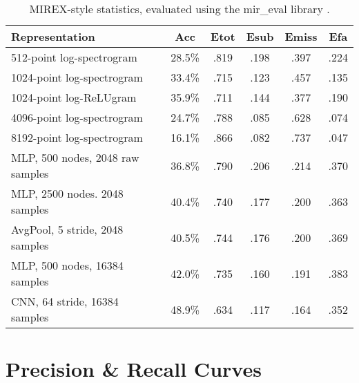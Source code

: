 \documentclass{article} \usepackage{iclr2017_conference,times}
\begin{document}
\begin{table}[h]
  \centering
  \begin{tabular}{lccccc}
    \toprule
    \cmidrule{1-6}
    Representation & Acc & Etot & Esub & Emiss & Efa\\
    \midrule
    512-point log-spectrogram & 28.5\% & .819 & .198 & .397 & .224 \\
    1024-point log-spectrogram & 33.4\% & .715 & .123 & .457 & .135 \\
    1024-point log-ReLUgram & 35.9\% & .711 & .144 & .377 & .190 \\
    4096-point log-spectrogram & 24.7\% & .788 & .085 & .628 & .074 \\
    8192-point log-spectrogram & 16.1\% & .866 & .082 & .737 & .047 \\
    MLP, 500 nodes, 2048 raw samples & 36.8\% & .790 & .206 & .214 & .370 \\
    MLP, 2500 nodes. 2048 samples & 40.4\% & .740 & .177 & .200 & .363 \\
    AvgPool, 5 stride, 2048 samples & 40.5\% & .744 & .176 & .200 & .369 \\
    MLP, 500 nodes, 16384 samples & 42.0\% & .735 & .160 & .191 & .383 \\
    CNN, 64 stride, 16384 samples & 48.9\% & .634 & .117 & .164 & .352 \\
    \bottomrule
  \end{tabular}
  \caption{MIREX-style statistics, evaluated using the mir\_eval library \citep{raffel2014}.}
\end{table} \clearpage

\section{Precision \& Recall Curves}
\end{document}

